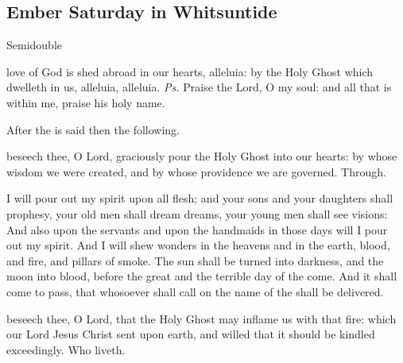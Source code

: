 \subsection{Ember Saturday in Whitsuntide}
\begin{inhead}
    {Semidouble}
\end{inhead}

\introit
{} love of God is shed abroad in our hearts, alleluia: by the Holy Ghost which dwelleth in us, alleluia, alleluia. \textit{Ps.} Praise the Lord, O my soul: and all that is within me, praise his holy name.

\begin{rubric}
	After the  is said  then the following.
\end{rubric}

\collect
{} beseech thee, O Lord, graciously pour the Holy Ghost into our hearts: by whose wisdom we were created, and by whose providence we are governed. Through.

 I will pour out my spirit upon all flesh; and your sons and your daughters shall prophesy, your old men shall dream dreams, your young men shall see visions: And also upon the servants and upon the handmaids in those days will I pour out my spirit. And I will shew wonders in the heavens and in the earth, blood, and fire, and pillars of smoke. The sun shall be turned into darkness, and the moon into blood, before the great and the terrible day of the  come. And it shall come to pass, that whosoever shall call on the name of the  shall be delivered.


\collect
{}
{} beseech thee, O Lord, that the Holy Ghost may inflame us with that fire: which our Lord Jesus Christ sent upon earth, and willed that it should be kindled exceedingly. Who liveth.

